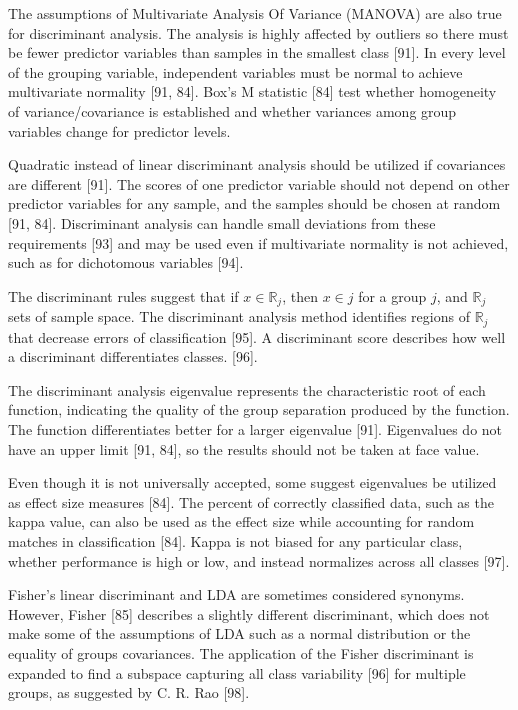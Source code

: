 \documentclass[sn-mathphys-num]{sn-jnl}%
\begin{document}
The assumptions of Multivariate Analysis Of Variance (MANOVA) are also true for discriminant analysis. The analysis is highly affected by outliers so there must be fewer predictor variables than samples in the smallest class [91]. In every level of the grouping variable, independent variables must be normal to achieve multivariate normality [91, 84]. Box's M statistic [84] test whether homogeneity of variance/covariance is established and whether variances among group variables change for predictor levels. 

Quadratic instead of linear discriminant analysis should be utilized if covariances are different [91]. The scores of one predictor variable should not depend on other predictor variables for any sample, and the samples should be chosen at random [91, 84]. Discriminant analysis can handle small deviations from these requirements [93] and may be used even if multivariate normality is not achieved, such as for dichotomous variables [94].

The discriminant rules suggest that if $x\in \mathbb{R}_{j}$, then $x\in j$ for a group $j$, and $\mathbb{R}_{j}$ sets of sample space. The discriminant analysis method identifies regions of $\mathbb{R}_{j}$ that decrease errors of classification [95]. A discriminant score describes how well a discriminant differentiates classes. [96].
 
The discriminant analysis eigenvalue represents the characteristic root of each function, indicating the quality of the group separation produced by the function. The function differentiates better for a larger eigenvalue [91]. Eigenvalues do not have an upper limit [91, 84], so the results should not be taken at face value.

Even though it is not universally accepted, some suggest eigenvalues be utilized as effect size measures [84]. The percent of correctly classified data, such as the kappa value, can also be used as the effect size while accounting for random matches in classification [84]. Kappa is not biased for any particular class, whether performance is high or low, and instead normalizes across all classes [97]. 

Fisher's linear discriminant and LDA are sometimes considered synonyms. However, Fisher [85] describes a slightly different discriminant, which does not make some of the assumptions of LDA such as a normal distribution or the equality of groups covariances. The application of the Fisher discriminant is expanded to find a subspace capturing all class variability [96] for multiple groups, as suggested by C. R. Rao [98].
\end{document}
